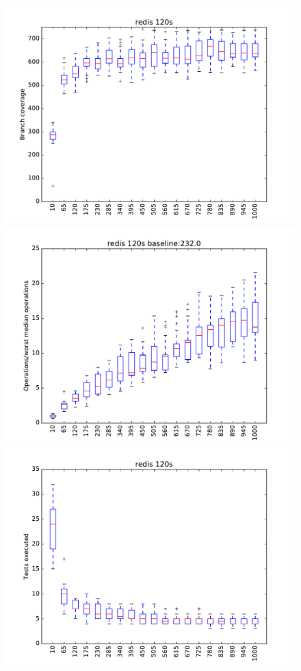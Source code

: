 \begin{figure}
\includegraphics[width=\columnwidth]{graphs/redisrand120}
\includegraphics[width=\columnwidth]{graphs/opsredisrand120}
\includegraphics[width=\columnwidth]{graphs/execredisrand120}
\end{figure}

